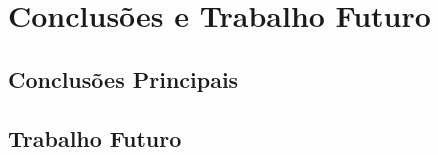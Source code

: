 \chapter{Conclusões e Trabalho Futuro}
\label{ch::conclusao}

\section{Conclusões Principais}
\label{sec::conclusao:principal}

\section{Trabalho Futuro}
\label{sec::conclusao:futuro}
